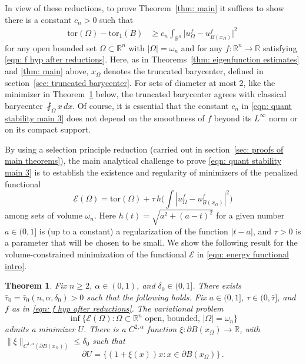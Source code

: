 \documentclass[10pt,a4paper]{amsart}
\numberwithin{equation}{section}
\newtheorem{theorem}{Theorem}[section]
\def\R{{\mathbb R}}
\def\W{\Omega}
\def\om{\omega}
\def\tor{\mathrm{tor}}
\def\err{\tau}
\begin{document}
In view of these reductions, to prove Theorem~\ref{thm: main} it suffices to show there is a constant $c_{n}>0$ such that 
\begin{align}
\label{eqn: quant stability main 3}
\tor(\W ) - \tor_1(B)  & \geq c_{n}\int_{\R^n} \big|u_{\W}^f - u_{B(x_\W)}^f\big|^2 \,
\end{align}
for any open bounded set $\W \subset \R^n$ with $|\W| = \om_n$ and for any  $f:\R^n \to \R$ satisfying \eqref{eqn: f hyp after reductions}. Here, as in Theorems~\ref{thm: eigenfunction estimates} and \ref{thm: main} above, $x_\W$  denotes the truncated barycenter, defined in section~\ref{sec: truncated barycenter}. For sets of diameter at most $2$, like the minimizer in Theorem~\ref{thm: summary for minimizers} below, the truncated barycenter agrees with classical barycenter $\fint_\W x\,dx$. Of course, it is essential that  the constant $c_{n}$ in \eqref{eqn: quant stability main 3} does not depend on the smoothness of $f$ beyond its $L^{\infty}$ norm or on its compact support.

By using a selection principle reduction (carried out in section~\ref{sec: proofs of main theorems}), the main analytical challenge to prove \eqref{eqn: quant stability main 3} is to establish the existence and regularity of minimizers of the penalized functional 
\begin{equation}\label{eqn: energy functional intro}
		 \mathcal{E}(\W) = \tor(\W) + \tau \, 
        h\Big(\int |u_\W^f - u_{B(x_\W)}^f|^2  \Big)  
	\end{equation} 
among sets of volume $\om_n$. Here $h(t) =\sqrt{a^2 +(a - t )^2}$ for a given number $a\in(0,1]$ is (up to a constant) a regularization of the function $|t-a|$, and $\tau>0$ is a parameter that will be chosen to be small.
We show the following result for the volume-constrained minimization of the functional $\mathcal{E}$ in \eqref{eqn: energy functional intro}.


\begin{theorem}\label{thm: summary for minimizers} \label{summary ex and reg theorem}
Fix $n\geq 2$, $\alpha\in (0,1)$, and $\delta_0\in (0,1]$. There exists $\bar{\err}_0= \bar{\err}_0(n,\alpha, \delta_0)>0$
such that the following holds. Fix $a\in (0,1]$, $\tau \in (0,\bar{\tau}]$, and $f$ as in \eqref{eqn: f hyp after reductions}. The variational problem 
\begin{equation}
	\label{eqn: main min prob}
\inf \{\mathcal{E}(\W) : \W \subset \R^n \text{ open, bounded, } |\W|= \omega_n\}
\end{equation}
admits a minimizer $U$. There is a $C^{2, \alpha}$ function $\xi: \partial B(x_\W) \to \R$, with  $\| \xi \|_{C^{1,\alpha}(\partial B(x_\W))} \leq \delta_0$ such that 
 \[
 \partial U = \{ (1+\xi(x))x : x \in \partial B(x_\W) \}\,. 
 \]
\end{theorem}
\end{document}
